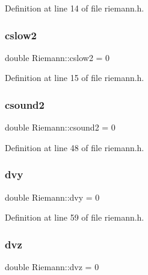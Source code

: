 Definition at line 14 of file riemann.\+h.

\mbox{\label{classRiemann_a52b1266fdc1e91bcb49dbbef307ab885}} 
\subsubsection{\texorpdfstring{cslow2}{cslow2}}
{\footnotesize\ttfamily double Riemann\+::cslow2 = 0\hspace{0.3cm}{\ttfamily [private]}}



Definition at line 15 of file riemann.\+h.

\mbox{\label{classRiemann_a047523b191dec91d1903326106e2df57}} 
\subsubsection{\texorpdfstring{csound2}{csound2}}
{\footnotesize\ttfamily double Riemann\+::csound2 = 0\hspace{0.3cm}{\ttfamily [private]}}



Definition at line 48 of file riemann.\+h.

\mbox{\label{classRiemann_a49d6107d6ceae20cb49257d6e69068d2}} 
\subsubsection{\texorpdfstring{dvy}{dvy}}
{\footnotesize\ttfamily double Riemann\+::dvy = 0\hspace{0.3cm}{\ttfamily [private]}}



Definition at line 59 of file riemann.\+h.

\mbox{\label{classRiemann_aa8ab20be9a3ff9fbf8b9941112da8ca7}} 
\subsubsection{\texorpdfstring{dvz}{dvz}}
{\footnotesize\ttfamily double Riemann\+::dvz = 0\hspace{0.3cm}{\ttfamily [private]}}



